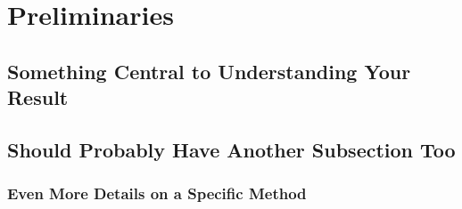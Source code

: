 \documentclass[../techreport.tex]{subfiles}
\begin{document}
\section{Preliminaries}
\label{sec:prelim}
\subsection{Something Central to Understanding Your Result}
\subsection{Should Probably Have Another Subsection Too}
\subsubsection{Even More Details on a Specific Method}
\end{document}

